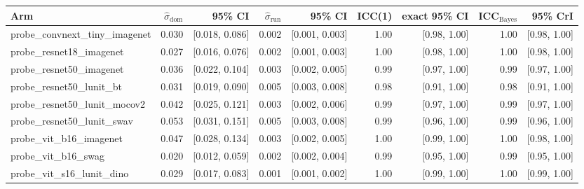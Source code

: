 \begin{tabular}{lrrrrrrrr}
\toprule
Arm & $\hat\sigma_\text{dom}$ & 95\% CI & $\hat\sigma_\text{run}$ & 95\% CI & ICC(1) & exact 95\% CI & ICC$_\text{Bayes}$ & 95\% CrI \\
\midrule
probe\_convnext\_tiny\_imagenet & 0.030 & [0.018, 0.086] & 0.002 & [0.001, 0.003] & 1.00 & [0.98, 1.00] & 1.00 & [0.98, 1.00] \\
probe\_resnet18\_imagenet & 0.027 & [0.016, 0.076] & 0.002 & [0.001, 0.003] & 1.00 & [0.98, 1.00] & 1.00 & [0.98, 1.00] \\
probe\_resnet50\_imagenet & 0.036 & [0.022, 0.104] & 0.003 & [0.002, 0.005] & 0.99 & [0.97, 1.00] & 0.99 & [0.97, 1.00] \\
probe\_resnet50\_lunit\_bt & 0.031 & [0.019, 0.090] & 0.005 & [0.003, 0.008] & 0.98 & [0.91, 1.00] & 0.98 & [0.91, 1.00] \\
probe\_resnet50\_lunit\_mocov2 & 0.042 & [0.025, 0.121] & 0.003 & [0.002, 0.006] & 0.99 & [0.97, 1.00] & 0.99 & [0.97, 1.00] \\
probe\_resnet50\_lunit\_swav & 0.053 & [0.031, 0.151] & 0.005 & [0.003, 0.008] & 0.99 & [0.96, 1.00] & 0.99 & [0.96, 1.00] \\
probe\_vit\_b16\_imagenet & 0.047 & [0.028, 0.134] & 0.003 & [0.002, 0.005] & 1.00 & [0.99, 1.00] & 1.00 & [0.98, 1.00] \\
probe\_vit\_b16\_swag & 0.020 & [0.012, 0.059] & 0.002 & [0.002, 0.004] & 0.99 & [0.95, 1.00] & 0.99 & [0.95, 1.00] \\
probe\_vit\_s16\_lunit\_dino & 0.029 & [0.017, 0.083] & 0.001 & [0.001, 0.002] & 1.00 & [0.99, 1.00] & 1.00 & [0.99, 1.00] \\
\bottomrule
\end{tabular}
